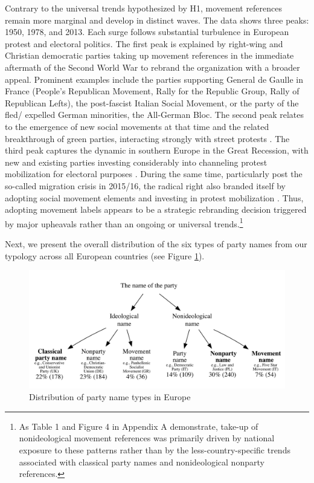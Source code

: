 \documentclass[12pt]{article}
\begin{document}
Contrary to the universal trends hypothesized by H1, movement references remain more marginal and develop in distinct waves. The data shows three peaks: 1950, 1978, and 2013. Each surge follows substantial turbulence in European protest and electoral politics. The first peak is explained by right-wing and Christian democratic parties taking up movement references in the immediate aftermath of the Second World War to rebrand the organization with a broader appeal. Prominent examples include the parties supporting General de Gaulle in France (People's Republican Movement, Rally for the Republic Group, Rally of Republican Lefts), the post-fascist Italian Social Movement, or the party of the fled/ expelled German minorities, the All-German Bloc. The second peak relates to the emergence of new social movements at that time and the related breakthrough of green parties, interacting strongly with street protests \citep[][]{Rohrschneider_1993}. The third peak captures the dynamic in southern Europe in the Great Recession, with new and existing  parties investing considerably into channeling protest mobilization for electoral purposes \citep[][]{della_Porta_et_al_2017}. During the same time, particularly post the so-called migration crisis in 2015/16, the radical right also branded itself by adopting social movement elements and investing in protest mobilization \citep[][]{Castelli_Gattinara_Pirro_2024}. Thus, adopting movement labels appears to be a strategic rebranding decision triggered by major upheavals rather than an ongoing or universal trends.\footnote{As Table 1 and Figure 4 in Appendix A demonstrate, take-up of nonideological movement references was primarily driven by national exposure to these patterns rather than by the less-country-specific trends associated with classical party names and nonideological nonparty references.} 

Next, we present the overall distribution of the six types of party names from our typology across all European countries (see Figure \ref{Fig:decision_tree}).

\begin{figure}[H] \includegraphics[width=\textwidth]{./figures/Figure2.png} \caption{Distribution of party name types in Europe} \label{Fig:decision_tree}  \end{figure}
\end{document}
